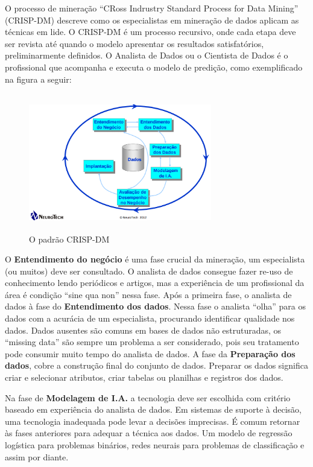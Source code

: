 O processo de mineração ``CRoss Indrustry Standard Process for Data Mining'' (CRISP-DM) \cite{Crisp2000} descreve como os especialistas em mineração de dados aplicam as técnicas em lide.
O CRISP-DM é um processo recursivo, onde cada etapa deve ser revista até quando o modelo apresentar os resultados satisfatórios, preliminarmente definidos.
O Analista de Dados ou o Cientista de Dados é o profissional que acompanha e executa o modelo de predição, como exemplificado na figura a seguir:

\begin{figure}[!ht]
\centering
\caption{O padrão CRISP-DM}
\includegraphics[width=80mm, height=60mm]{Figuras/BigData/CrispDM.png}
\end{figure}

O \textbf{Entendimento do negócio} é uma fase crucial da mineração, um especialista (ou muitos) deve ser consultado. O analista de dados consegue fazer re-uso de conhecimento lendo periódicos e artigos, 
mas a experiência de um profissional da área é condição ``sine qua non'' nessa fase.
Após a primeira fase, o analista de dados à fase do \textbf{Entendimento dos dados}. Nessa fase o analista ``olha'' para os dados com a acurácia de um especialista, 
procurando identificar qualidade nos dados. Dados ausentes são comuns em bases de dados não estruturadas, os ``missing data'' são sempre um problema a ser considerado, 
pois seu tratamento pode consumir muito tempo do analista de dados. 
A fase da \textbf{Preparação dos dados}, cobre a construção final do conjunto de dados. Preparar os dados significa criar e selecionar atributos, criar tabelas ou planilhas e registros dos dados.

Na fase de \textbf{Modelagem de I.A.} a tecnologia deve ser escolhida com critério baseado em experiência do analista de dados. 
Em sistemas de suporte à decisão, uma tecnologia inadequada pode levar a decisões imprecisas. É comum retornar às fases anteriores para adequar a técnica aos dados. 
Um modelo de regressão logística para problemas binários, redes neurais para problemas de classificação e assim por diante.

